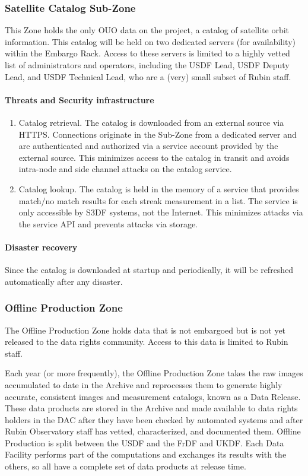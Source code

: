 \subsubsection{Satellite Catalog Sub-Zone} \label{sec:satcat}
This \gls{Zone} holds the only \gls{OUO} data on the project, a catalog of satellite orbit information.
This catalog will be held on two dedicated servers (for availability) within the Embargo Rack.
Access to these servers is limited to a highly vetted list of administrators and operators, including the \gls{USDF} Lead, \gls{USDF} Deputy Lead, and \gls{USDF} Technical Lead, who are a (very) small subset of Rubin staff.

\paragraph{ Threats and Security infrastructure}
\begin{enumerate}
\item Catalog retrieval.  The catalog is downloaded from an external source via HTTPS.  Connections originate in the Sub-Zone from a dedicated server and are authenticated and authorized via a service account provided by the external source.  This minimizes access to the catalog in transit and avoids intra-node and side channel attacks on the catalog service.
\item Catalog lookup.  The catalog is held in the memory of a service that provides match/no match results for each streak measurement in a list.  The service is only accessible by S3DF systems, not the Internet.  This minimizes attacks via the service \gls{API} and prevents attacks via storage.
\end{enumerate}

\paragraph{Disaster recovery}
Since the catalog is downloaded at startup and periodically, it will be refreshed automatically after any disaster.

\subsubsection{ Offline Production Zone}

The Offline Production \gls{Zone} holds data that is not embargoed but is not yet released to the data rights community.
Access to this data is limited to Rubin staff.

Each year (or more frequently), the Offline Production Zone takes the raw images accumulated to date in the \gls{Archive} and reprocesses them to generate highly accurate, consistent images and measurement catalogs, known as a Data Release. These data products are stored in the \gls{Archive} and made available to data rights holders in the DAC after they have been checked by automated systems and after Rubin Observatory staff has vetted, characterized, and documented them. Offline Production is split between the USDF and the \gls{FrDF} and UKDF. Each Data Facility performs part of the computations and exchanges its results with the others, so all have a complete set of data products at release time.


